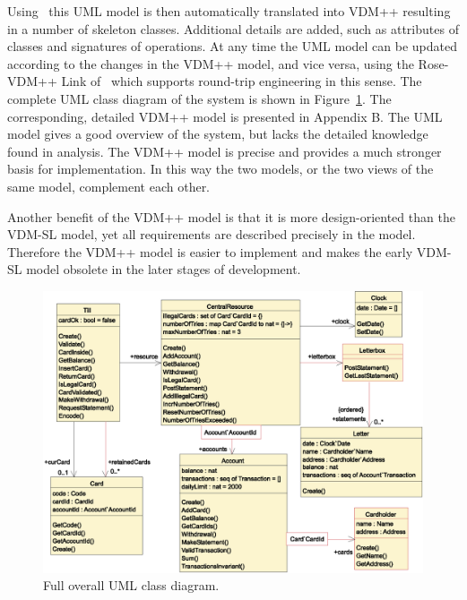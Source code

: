 \documentclass[\pformat,12pt,twoside]{article}
\begin{document}
Using \vdmtools\  this UML model is then automatically 
translated into VDM++ resulting in a number of skeleton classes. 
Additional details are added, such as attributes of classes and 
signatures of operations. 
At any time the UML model can be updated according to the changes 
in the VDM++ model, and vice versa, using the Rose-VDM++ Link 
of \vdmtools\  which supports round-trip engineering 
in this sense. The complete UML class diagram of the system is shown 
in Figure~\ref{fig:VDM++full}. The corresponding, detailed VDM++ model is presented in 
Appendix B. The UML model gives a good overview of the system, 
but lacks the detailed knowledge found in analysis. The VDM++ 
model is precise and provides a much stronger basis for implementation. 
In this way the two models, or the two views of the same model, 
complement each other.

Another benefit of the VDM++ model is that it is more design-oriented 
than the VDM-SL model, yet all requirements are described precisely 
in the model. Therefore the VDM++ model is easier to implement 
and makes the early VDM-SL model obsolete in the later stages 
of development.

\noindent
\begin{figure}[tb]
\begin{center}
\includegraphics[width=.9\textwidth]{fullclassdiagram2}
\caption{Full overall UML class diagram.\label{fig:VDM++full}}
\end{center}
\end{figure}
\end{document}
